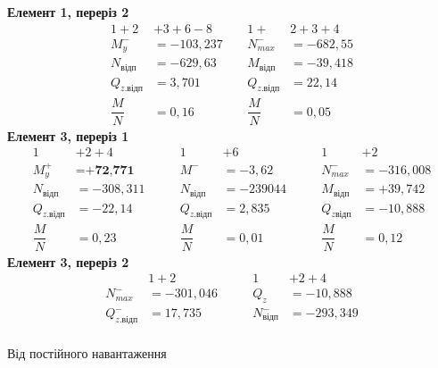 \documentclass[a4paper,14pt]{article}
\begin{document}
\begin{enumerate}
    \textbf{Елемент 1, переріз 2}
    \begin{equation*}
        \begin{aligned}
        1+2&+3+6-8\qquad  &1+&2+3+4\\
        M^-_y &= -103,237 &N^-_{max} &= -682,55 \\
        N_\textit{відп} &= -629,63  &M_\textit{відп} &= -39,418\\
        Q_\textit{z.відп} &= 3,701 &Q_\textit{z.відп} &= 22,14 \\
        \dfrac{M}{N}&=0,16  &\dfrac{M}{N}&=0,05  
        \end{aligned}
    \end{equation*}
        \textbf{Елемент 3, переріз 1}
        \begin{equation*}
        \begin{aligned}
        1&+2+4  &1&+6 &1&+2\\
        M^+_y &= \textbf{+72,771} &M^- &= -3,62 &N^-_{max} &= -316,008\\
        N_\textit{відп} &= -308,311\qquad  &N_\textit{відп} &= -239044\qquad &M_\textit{відп} &= +39,742 \\
        Q_\textit{z.відп} &= -22,14 &Q_\textit{z.відп} &= 2,835 &Q_\textit{zвідп} &= -10,888 \\
        \dfrac{M}{N}&=0,23  &\dfrac{M}{N}&=0,01 &\dfrac{M}{N}&=0,12
        \end{aligned}
        \end{equation*}
        \textbf{Елемент 3, переріз 2}
        \begin{equation*}
        \begin{aligned}
        &1+2  &1&+2+4\\
        N^-_{max} &= -301,046\qquad &Q_z &= -10,888 \\
        Q^-_\textit{z.відп} &= 17,735 &N^-_\textit{відп} &= -293,349 \\
        \end{aligned}
        \end{equation*}

        Від постійного навантаження


\end{enumerate}
\end{document}
